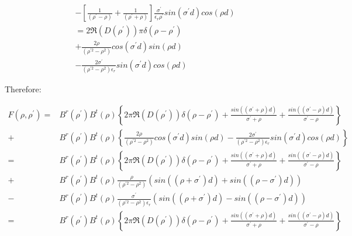 \documentclass[11pt, oneside]{article}   	%
\begin{document}
\begin{align*}
 & -\left[\frac{1}{\left(\rho^{\prime}-\rho\right)}+\frac{1}{\left(\rho^{\prime}+\rho\right)}\right]\frac{\sigma^{\prime}}{\epsilon_{r}\rho^{\prime}}sin\left(\sigma^{\prime}d\right)cos\left(\rho d\right)\\
 & =2\Re\left(D\left(\rho^{\prime}\right)\right)\pi\delta\left(\rho-\rho^{\prime}\right)\\
 & +\frac{2\rho}{\left(\rho^{\prime2}-\rho^{2}\right)}cos\left(\sigma^{\prime}d\right)sin\left(\rho d\right)\\
 & -\frac{2\sigma^{\prime}}{\left(\rho^{\prime2}-\rho^{2}\right)\epsilon_{r}}sin\left(\sigma^{\prime}d\right)cos\left(\rho d\right)
\end{align*}


Therefore:

\begin{align*}
F\left(\rho,\rho^{\prime}\right)= & B^{r}\left(\rho^{\prime}\right)B^{t}\left(\rho\right)\left\{ 2\pi\Re\left(D\left(\rho^{\prime}\right)\right)\delta\left(\rho-\rho^{\prime}\right)+\frac{sin\left(\left(\sigma^{\prime}+\rho\right)d\right)}{\sigma^{\prime}+\rho}+\frac{sin\left(\left(\sigma^{\prime}-\rho\right)d\right)}{\sigma^{\prime}-\rho}\right\} \\
+ & B^{r}\left(\rho^{\prime}\right)B^{t}\left(\rho\right)\left\{ \frac{2\rho}{\left(\rho^{\prime2}-\rho^{2}\right)}cos\left(\sigma^{\prime}d\right)sin\left(\rho d\right)-\frac{2\sigma^{\prime}}{\left(\rho^{\prime2}-\rho^{2}\right)\epsilon_{r}}sin\left(\sigma^{\prime}d\right)cos\left(\rho d\right)\right\} \\
= & B^{r}\left(\rho^{\prime}\right)B^{t}\left(\rho\right)\left\{ 2\pi\Re\left(D\left(\rho^{\prime}\right)\right)\delta\left(\rho-\rho^{\prime}\right)+\frac{sin\left(\left(\sigma^{\prime}+\rho\right)d\right)}{\sigma^{\prime}+\rho}+\frac{sin\left(\left(\sigma^{\prime}-\rho\right)d\right)}{\sigma^{\prime}-\rho}\right\} \\
+ & B^{r}\left(\rho^{\prime}\right)B^{t}\left(\rho\right)\frac{\rho}{\left(\rho^{\prime2}-\rho^{2}\right)}\left(sin\left(\left(\rho+\sigma^{\prime}\right)d\right)+sin\left(\left(\rho-\sigma^{\prime}\right)d\right)\right)\\
- & B^{r}\left(\rho^{\prime}\right)B^{t}\left(\rho\right)\frac{\sigma^{\prime}}{\left(\rho^{\prime2}-\rho^{2}\right)\epsilon_{r}}\left(sin\left(\left(\rho+\sigma^{\prime}\right)d\right)-sin\left(\left(\rho-\sigma^{\prime}\right)d\right)\right)\\
= & B^{r}\left(\rho^{\prime}\right)B^{t}\left(\rho\right)\left\{ 2\pi\Re\left(D\left(\rho^{\prime}\right)\right)\delta\left(\rho-\rho^{\prime}\right)+\frac{sin\left(\left(\sigma^{\prime}+\rho\right)d\right)}{\sigma^{\prime}+\rho}+\frac{sin\left(\left(\sigma^{\prime}-\rho\right)d\right)}{\sigma^{\prime}-\rho}\right\} \\

\end{align*}
\end{document}
